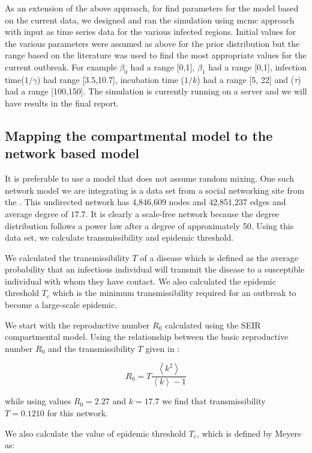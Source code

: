 \documentclass[10pt, journal,onecolumn]{IEEEtran}
\begin{document}
As an extension of the above approach, for find parameters for the model based on the current data, we designed and ran the simulation using mcmc approach with input as time series data for the various infected regions.
Initial values for the various parameters were assumed as above for the prior distribution but the range based on the literature was used to find the most appropriate values for the current outbreak. For example $\beta_0$  had a range [0,1],  $\beta_1$ had a range [0,1], infection time($1/\gamma$) had range [3.5,10.7], incubation time ($1/k$) had a range [5, 22] and ($\tau$)  had a range [100,150]. The simulation is currently running on a server and we will have results in the final report.




\subsection*{\textbf{Mapping the compartmental model to the network based model}}

It is preferable to use a model that does not assume random mixing.
One such network model we are integrating is a data set from a social networking site from
the \cite{topcoderdata}.
This undirected network has 4,846,609 nodes and 42,851,237 edges and average degree of $17.7$.
It is clearly a scale-free network because the degree distribution follows a power law after a degree of
approximately 50.
Using this data set, we calculate transmissibility and epidemic threshold.

We calculated the transmissibility $T$ of a disease which is defined as the average probability that an infectious
individual will transmit the disease to a susceptible individual with whom they have contact. We also calculated
the epidemic threshold $T_c$ which is the minimum transmissibility required for an outbreak to become
a large-scale epidemic.

We start with the reproductive number $R_0$ calculated using the SEIR compartmental model.
Using the relationship between the basic reproductive number
$R_0$ and the transmissibility $T$ given in \cite{meyers2005network}:

\[
R_0 = T  \dfrac{\left\langle k^2 \right\rangle}{\left\langle k \right\rangle-1}
\]

while using values $R_0=2.27$ and $k=17.7$ we find that transmissibility $T=0.1210$ for this network.

We also calculate the value of epidemic threshold $T_c$, which is defined by Meyers as:
\end{document}
